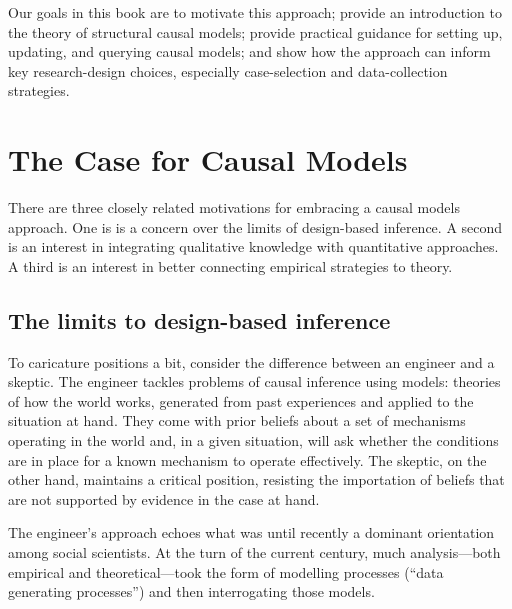 \documentclass[
  12pt,
]{book}
\begin{document}
Our goals in this book are to motivate this approach; provide an introduction to the theory of structural causal models; provide practical guidance for setting up, updating, and querying causal models; and show how the approach can inform key research-design choices, especially case-selection and data-collection strategies.

\hypertarget{the-case-for-causal-models}{%
\section{The Case for Causal Models}\label{the-case-for-causal-models}}

There are three closely related motivations for embracing a causal models approach.
One is is a concern over the limits of design-based inference. A second is an interest in integrating qualitative knowledge with quantitative approaches. A third is an interest in better connecting empirical strategies to theory.

\hypertarget{the-limits-to-design-based-inference}{%
\subsection{The limits to design-based inference}\label{the-limits-to-design-based-inference}}

To caricature positions a bit, consider the difference between an engineer and a skeptic. The engineer tackles problems of causal inference using models: theories of how the world works, generated from past experiences and applied to the situation at hand. They come with prior beliefs about a set of mechanisms operating in the world and, in a given situation, will ask whether the conditions are in place for a known mechanism to operate effectively. The skeptic, on the other hand, maintains a critical position, resisting the importation of beliefs that are not supported by evidence in the case at hand.

The engineer's approach echoes what was until recently a dominant orientation among social scientists. At the turn of the current century, much analysis---both empirical and theoretical---took the form of modelling processes (``data generating processes'') and then interrogating those models.
\end{document}

